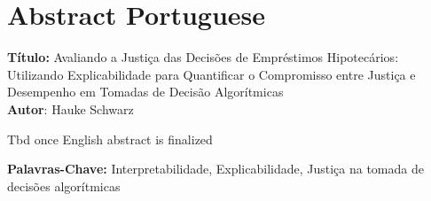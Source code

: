 \chapter*{Abstract Portuguese}\label{abstractp}

\noindent
\textbf{Título:} Avaliando a Justiça das Decisões de Empréstimos Hipotecários: \\
Utilizando Explicabilidade para Quantificar o Compromisso entre Justiça e Desempenho em Tomadas de Decisão Algorítmicas\\
\textbf{Autor}: Hauke Schwarz
\vspace{1em}

Tbd once English abstract is finalized

\vspace{3em}

\textbf{Palavras-Chave:} Interpretabilidade, Explicabilidade, Justiça na tomada de decisões algorítmicas \\